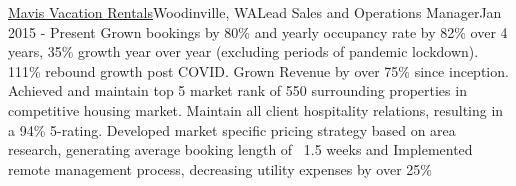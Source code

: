 \resumeSubheading
{\href{https://www.vrbo.com/895076/}{Mavis Vacation Rentals}}{Woodinville, WA}{Lead Sales and Operations Manager}{Jan 2015 - Present}
    \resumeItemListStart
          {Grown bookings by 80\% and yearly occupancy rate by 82\% over 4 years, 35\% growth year over year (excluding periods of pandemic lockdown). 111\% rebound growth post COVID.  Grown Revenue by over 75\% since inception.}
          {Achieved and maintain top 5 market rank of 550 surrounding properties in competitive housing market. Maintain all client hospitality relations, resulting in a 94\% 5-rating. }
          {Developed market specific pricing strategy based on area research, generating average booking length of ~1.5 weeks and Implemented remote management process, decreasing utility expenses by over 25\%}
    \resumeItemListEnd